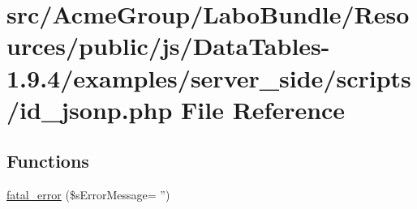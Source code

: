 \hypertarget{id__jsonp_8php}{\section{src/\+Acme\+Group/\+Labo\+Bundle/\+Resources/public/js/\+Data\+Tables-\/1.9.4/examples/server\+\_\+side/scripts/id\+\_\+jsonp.php File Reference}
\label{id__jsonp_8php}
}
\subsection*{Functions}
\begin{DoxyCompactItemize}
\item 
\hyperlink{id__jsonp_8php_a1bb235f2e57f0389e14b11592d32119a}{fatal\+\_\+error} (\$s\+Error\+Message= '')
\end{DoxyCompactItemize}

